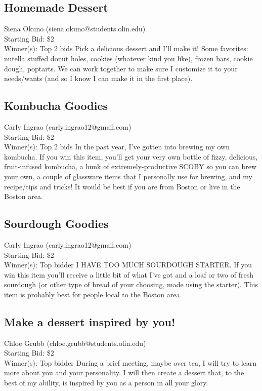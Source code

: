 \documentclass[11pt]{article}
\begin{document}
\subsection{Homemade Dessert}
Siena Okuno (siena.okuno@students.olin.edu) \\
Starting Bid: \$2 \\
Winner(s): 
Top 2 bids\newline
Pick a delicious dessert and I'll make it! Some favorites: nutella stuffed donut holes, cookies (whatever kind you like), frozen bars, cookie dough, poptarts. We can work together to make sure I customize it to your needs/wants (and so I know I can make it in the first place).
\subsection{Kombucha Goodies}
Carly Ingrao (carly.ingrao12@gmail.com) \\
Starting Bid: \$2 \\
Winner(s): 
Top 2 bids\newline
In the past year, I've gotten into brewing my own kombucha. If you win this item, you'll get your very own bottle of fizzy, delicious, fruit-infused kombucha, a hunk of extremely-productive SCOBY so you can brew your own, a couple of glassware items that I personally use for brewing, and my recipe/tips and tricks! It would be best if you are from Boston or live in the Boston area.
\subsection{Sourdough Goodies}
Carly Ingrao (carly.ingrao12@gmail.com) \\
Starting Bid: \$2 \\
Winner(s): 
Top bidder\newline
I HAVE TOO MUCH SOURDOUGH STARTER. If you win this item you'll receive a little bit of what I've got and a loaf or two of fresh sourdough (or other type of bread of your choosing, made using the starter). This item is probably best for people local to the Boston area.
\subsection{Make a dessert inspired by you!}
Chloe Grubb (chloe.grubb@students.olin.edu) \\
Starting Bid: \$2 \\
Winner(s): 
Top bidder\newline
During a brief meeting, maybe over tea, I will try to learn more about you and your personality. I will then create a dessert that, to the best of my ability, is inspired by you as a person in all your glory.
\end{document}
